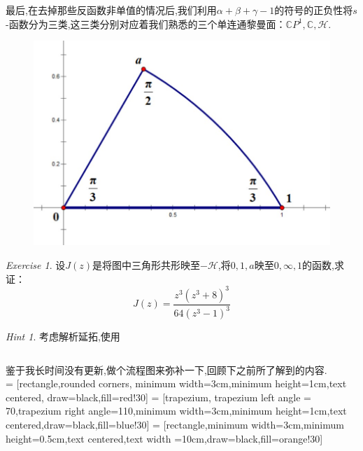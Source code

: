 \documentclass[12pt,A4paper,oneside]{amsart}
\numberwithin{equation}{section}
\theoremstyle{plain}
\theoremstyle{plain}
\theoremstyle{plain}
\numberwithin{equation}{section}
\theoremstyle{remark}
\newtheorem{ex}[theorem]{Exercise}
\newtheorem{hint}[theorem]{Hint}
\begin{document}
最后,在去掉那些反函数非单值的情况后,我们利用$\alpha+\beta+\gamma-1$的符号的正负性将$s$-函数分为三类,这三类分别对应着我们熟悉的三个单连通黎曼面：$\mathbb{C}P^1,\mathbb{C},\mathcal{H}$.
\begin{figure}[th]
\begin{minipage}[t]{.49\textwidth}
	\centering
	\includegraphics[width=.95\textwidth]{figures/triangle.jpg}\\
	\caption{}
	\label{fig1}
\end{minipage}
\end{figure}
\begin{ex}
	设$J(z)$是将图中三角形共形映至$-\mathcal{H}$,将$0,1,a$映至$0,\infty,1$的函数,求证：
	$$J(z)=\frac{z^3(z^3+8)^3}{64(z^3-1)^3}$$
\end{ex}
\begin{hint}
	考虑解析延拓,使用\cite{ahlfors1979complex}
\end{hint}
\begin{center}
	\begin{tabular*}{5cm}{c}
		\hline
	\end{tabular*}
\end{center}
鉴于我长时间没有更新,做个流程图来弥补一下,回顾下之前所了解到的内容.
\\


 = [rectangle,rounded corners, minimum width=3cm,minimum height=1cm,text centered, draw=black,fill=red!30]
 = [trapezium, trapezium left angle = 70,trapezium right angle=110,minimum width=3cm,minimum height=1cm,text centered,draw=black,fill=blue!30]
 = [rectangle,minimum width=3cm,minimum height=0.5cm,text centered,text width =10cm,draw=black,fill=orange!30]
\end{document}
